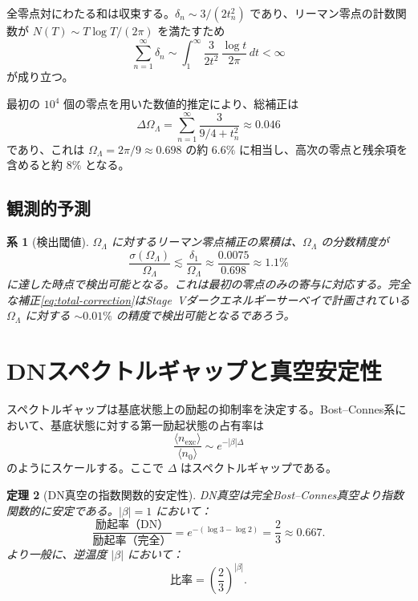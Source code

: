 \documentclass[12pt,a4paper]{article}
\newtheorem{theorem}{定理}[section]
\newtheorem{corollary}[theorem]{系}
\newcommand{\OL}{\Omega_\Lambda}
\begin{document}
全零点対にわたる和は収束する。$\delta_n \sim 3/(2t_n^2)$ であり、リーマン零点の計数関数が $N(T) \sim T\log T/(2\pi)$ を満たすため
\begin{equation}
  \sum_{n=1}^\infty \delta_n \sim \int_1^\infty \frac{3}{2t^2}\,\frac{\log t}{2\pi}\,dt < \infty
\end{equation}
が成り立つ。

最初の $10^4$ 個の零点を用いた数値的推定により、総補正は
\begin{equation}\label{eq:total-correction}
  \Delta\OL = \sum_{n=1}^{\infty} \frac{3}{9/4 + t_n^2} \approx 0.046
\end{equation}
であり、これは $\OL = 2\pi/9 \approx 0.698$ の約 $6.6\%$ に相当し、高次の零点と残余項を含めると約 $8\%$ となる。

\subsection{観測的予測}

\begin{corollary}[検出閾値]\label{cor:detect}
$\OL$ に対するリーマン零点補正の累積は、$\OL$ の分数精度が
\begin{equation}
  \frac{\sigma(\OL)}{\OL} \lesssim \frac{\delta_1}{\OL} \approx \frac{0.0075}{0.698} \approx 1.1\%
\end{equation}
に達した時点で検出可能となる。これは最初の零点のみの寄与に対応する。完全な補正\eqref{eq:total-correction}はStage~Vダークエネルギーサーベイで計画されている $\OL$ に対する $\sim 0.01\%$ の精度で検出可能となるであろう。
\end{corollary}

\section{DNスペクトルギャップと真空安定性}
\label{sec:stability}

スペクトルギャップは基底状態上の励起の抑制率を決定する。Bost--Connes系において、基底状態に対する第一励起状態の占有率は
\begin{equation}
  \frac{\langle n_{\mathrm{exc}}\rangle}{\langle n_0\rangle} \sim e^{-|\beta|\Delta}
\end{equation}
のようにスケールする。ここで $\Delta$ はスペクトルギャップである。

\begin{theorem}[DN真空の指数関数的安定性]\label{thm:stability}
DN真空は完全Bost--Connes真空より指数関数的に安定である。$|\beta| = 1$ において：
\begin{equation}
  \frac{\text{励起率（DN）}}{\text{励起率（完全）}} = e^{-(\log 3 - \log 2)} = \frac{2}{3} \approx 0.667.
\end{equation}
より一般に、逆温度 $|\beta|$ において：
\begin{equation}
  \text{比率} = \left(\frac{2}{3}\right)^{|\beta|}.
\end{equation}
\end{theorem}
\end{document}
